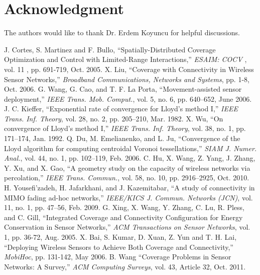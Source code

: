 \documentclass[journal,draftcls,onecolumn,12pt,twoside, narroweqnarray]{IEEEtran}
\begin{document}
\section*{Acknowledgment}


The authors would like to thank Dr. Erdem Koyuncu for helpful discussions.


\ifCLASSOPTIONcaptionsoff
  \newpage
\fi







\begin{thebibliography}{1}
J. Cortes, S. Martinez and F. Bullo, ``Spatially-Distributed Coverage Optimization and Control with Limited-Range Interactions,'' {\it ESAIM: COCV} , vol. 11 , pp. 691-719, Oct. 2005.
X. Liu, ``Coverage with Connectivity in Wireless Sensor Networks,'' {\it Broadband Communications, Networks and Systems}, pp. 1-8, Oct. 2006.
G. Wang, G. Cao, and T. F. La Porta, ``Movement-assisted sensor deployment,'' \emph{IEEE Trans. Mob. Comput.}, vol. 5, no. 6, pp. 640--652, June 2006.
J. C. Kieffer, ``Exponential rate of convergence for Lloyd's method I,'' \emph{IEEE Trans. Inf. Theory}, vol. 28, no. 2, pp. 205--210, Mar. 1982.
X. Wu, ``On convergence of Lloyd's method I,'' \emph{IEEE Trans. Inf. Theory}, vol. 38, no. 1, pp. 171--174, Jan. 1992.
Q. Du, M. Emelianenko, and L. Ju, ``Convergence of the Lloyd algorithm for computing centroidal Voronoi tessellations,'' \emph{SIAM J. Numer. Anal.}, vol. 44, no. 1, pp. 102--119, Feb. 2006.
C. Hu, X. Wang, Z. Yang, J. Zhang, Y. Xu, and X. Gao, ``A geometry study on the capacity of wireless networks via percolation,'' \emph{IEEE Trans. Commun.}, vol. 58, no. 10, pp. 2916--2925, Oct. 2010.
H. Yousefi'zadeh, H. Jafarkhani, and J. Kazemitabar, ``A study of connectivity in MIMO fading ad-hoc networks,'' \emph{IEEE/KICS J. Commun. Networks (JCN)}, vol. 11, no. 1, pp. 47--56, Feb. 2009.
G. Xing, X. Wang, Y. Zhang, C. Lu, R. Pless, and C. Gill, ``Integrated Coverage and Connectivity Configuration for Energy Conservation in Sensor Networks,'' {\it ACM Transactions on Sensor Networks}, vol. 1, pp. 36-72, Aug. 2005.
X. Bai, S. Kumar, D. Xuan, Z. Yun and T. H. Lai, ``Deploying Wireless Sensors to Achieve Both Coverage and Connectivity,'' {\it MobiHoc}, pp. 131-142, May 2006.
B. Wang ``Coverage Problems in Sensor Networks: A Survey,'' {\it ACM Computing Surveys}, vol. 43, Article 32, Oct. 2011.

\end{thebibliography}
\end{document}
